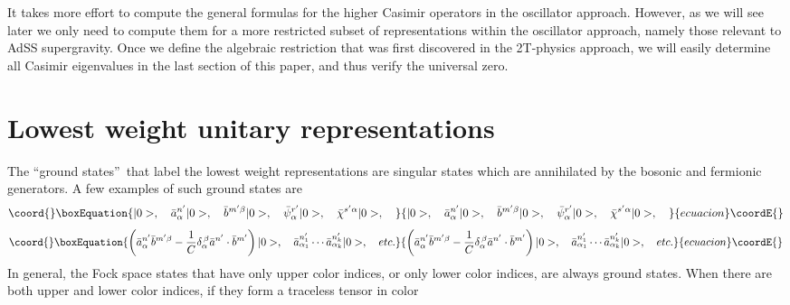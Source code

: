 \documentclass[a4paper,aps,preprint,nofootinbib]{revtex4}
\begin{document}
It takes more effort to compute the general formulas for the
higher Casimir operators in the oscillator approach. However, as
we will see later we only need to compute them for a more
restricted subset of representations within the oscillator
approach, namely those relevant to AdS\myHighlight{$_5\times$}\coordHE{}S\coordHE{}
supergravity. Once we define the algebraic restriction that was
first discovered in the 2T-physics approach, we will easily
determine all Casimir eigenvalues in the last section of this
paper, and thus verify the universal zero.

\section{Lowest weight unitary representations}

The \textquotedblleft ground states\textquotedblright\ that label the lowest
weight representations are singular states which are annihilated by the
bosonic \coordHE{}  \myHighlight{$\psi\cdot\chi$}\coordHE{} and fermionic \coordHE{}  \coordHE{}
generators. A few examples of such ground states are
\begin{equation}\coord{}\boxEquation{
|0>,\quad\bar{a}_{\alpha}^{n^{\prime}}|0>,\quad\bar{b}^{m^{\prime}\beta
}|0>,\quad\bar{\psi}_{\alpha}^{r^{\prime}}|0>,\quad\bar{\chi}^{s^{\prime
}\alpha}|0>,\quad
}{
|0>,\quad\bar{a}_{\alpha}^{n^{\prime}}|0>,\quad\bar{b}^{m^{\prime}\beta
}|0>,\quad\bar{\psi}_{\alpha}^{r^{\prime}}|0>,\quad\bar{\chi}^{s^{\prime
}\alpha}|0>,\quad
}{ecuacion}\coordE{}\end{equation}%
\begin{equation}\coord{}\boxEquation{
\left( \bar{a}_{\alpha}^{n^{\prime}}\bar{b}^{m^{\prime}\beta}-\frac{1}{C}
\delta_{\alpha}^{\,\beta}\bar{a}^{n^{\prime}}\cdot\bar{b}^{m^{\prime}}
\right) |0>,\quad\bar{a}_{\alpha_{1}}^{n_{1}^{\prime}}\cdots\bar{a}
_{\alpha_{k}}^{n_{k}^{\prime}}|0>,\quad etc.
}{
\left( \bar{a}_{\alpha}^{n^{\prime}}\bar{b}^{m^{\prime}\beta}-\frac{1}{C}
\delta_{\alpha}^{\,\beta}\bar{a}^{n^{\prime}}\cdot\bar{b}^{m^{\prime}}
\right) |0>,\quad\bar{a}_{\alpha_{1}}^{n_{1}^{\prime}}\cdots\bar{a}
_{\alpha_{k}}^{n_{k}^{\prime}}|0>,\quad etc.
}{ecuacion}\coordE{}\end{equation}
In general, the Fock space states that have only upper color indices, or
only lower color indices, are always ground states. When there are both
upper and lower color indices, if they form a traceless tensor in color
\end{document}
